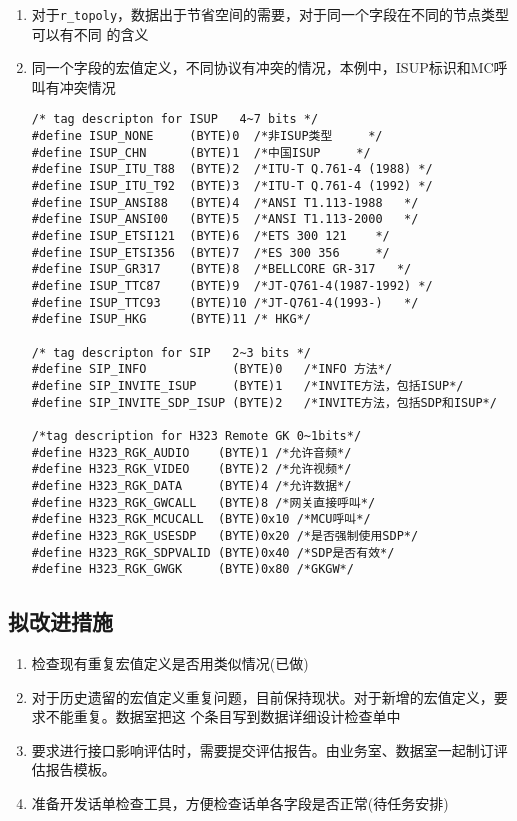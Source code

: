 \documentclass[12pt,a4paper,onecolumn]{article}
\begin{document}
\begin{enumerate}
    \item 对于\lstinline{r_topoly}，数据出于节省空间的需要，对于同一个字段在不同的节点类型可以有不同
      的含义
    \item 同一个字段的宏值定义，不同协议有冲突的情况，本例中，ISUP标识和MC呼叫有冲突情况
\begin{scriptsize}
\begin{lstlisting}
/* tag descripton for ISUP   4~7 bits */
#define ISUP_NONE     (BYTE)0  /*非ISUP类型     */
#define ISUP_CHN      (BYTE)1  /*中国ISUP     */
#define ISUP_ITU_T88  (BYTE)2  /*ITU-T Q.761-4 (1988) */
#define ISUP_ITU_T92  (BYTE)3  /*ITU-T Q.761-4 (1992) */
#define ISUP_ANSI88   (BYTE)4  /*ANSI T1.113-1988   */
#define ISUP_ANSI00   (BYTE)5  /*ANSI T1.113-2000   */
#define ISUP_ETSI121  (BYTE)6  /*ETS 300 121    */
#define ISUP_ETSI356  (BYTE)7  /*ES 300 356     */
#define ISUP_GR317    (BYTE)8  /*BELLCORE GR-317   */
#define ISUP_TTC87    (BYTE)9  /*JT-Q761-4(1987-1992) */
#define ISUP_TTC93    (BYTE)10 /*JT-Q761-4(1993-)   */
#define ISUP_HKG      (BYTE)11 /* HKG*/

/* tag descripton for SIP   2~3 bits */
#define SIP_INFO            (BYTE)0   /*INFO 方法*/
#define SIP_INVITE_ISUP     (BYTE)1   /*INVITE方法，包括ISUP*/
#define SIP_INVITE_SDP_ISUP (BYTE)2   /*INVITE方法，包括SDP和ISUP*/

/*tag description for H323 Remote GK 0~1bits*/
#define H323_RGK_AUDIO    (BYTE)1 /*允许音频*/
#define H323_RGK_VIDEO    (BYTE)2 /*允许视频*/
#define H323_RGK_DATA     (BYTE)4 /*允许数据*/
#define H323_RGK_GWCALL   (BYTE)8 /*网关直接呼叫*/
#define H323_RGK_MCUCALL  (BYTE)0x10 /*MCU呼叫*/
#define H323_RGK_USESDP   (BYTE)0x20 /*是否强制使用SDP*/
#define H323_RGK_SDPVALID (BYTE)0x40 /*SDP是否有效*/
#define H323_RGK_GWGK     (BYTE)0x80 /*GKGW*/
\end{lstlisting}
\end{scriptsize}
\end{enumerate}
\subsection{拟改进措施}
\begin{enumerate}
    \item 检查现有重复宏值定义是否用类似情况(已做)
    \item 对于历史遗留的宏值定义重复问题，目前保持现状。对于新增的宏值定义，要求不能重复。数据室把这
      个条目写到数据详细设计检查单中
    \item 要求进行接口影响评估时，需要提交评估报告。由业务室、数据室一起制订评估报告模板。
    \item 准备开发话单检查工具，方便检查话单各字段是否正常(待任务安排)
\end{enumerate}
\end{document}
